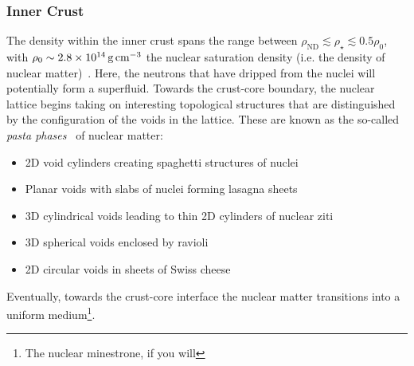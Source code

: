 \subsubsection*{Inner Crust}
The density within the inner crust spans the range between $\rho_\mathrm{ND}\lesssim \rho_\star \lesssim 0.5\rho_0$, with $\rho_0 \sim 2.8\times 10^{14}{\rm \,g}{\rm \,cm}^{-3}$ the nuclear saturation density (i.e. the density of nuclear matter)~\cite{Lattimer:2004pg_Physicsneutronstars,Haensel_NeutronstarsEqation,Grill:2014aea_Equationstatethickness}. Here, the neutrons that have dripped from the nuclei will potentially form a superfluid. Towards the crust-core boundary, the nuclear lattice begins taking on interesting topological structures that are distinguished by the configuration of the voids in the lattice. These are known as the so-called \textit{pasta phases}~\cite{Watanabe:2004tr_SimulationtransitionsPasta,Avancini:2010ch_Warmpastaphase,Yakovlev:2015vma_Electrontransportnuclear} of nuclear matter:
\begin{itemize}
    \item 2D void cylinders creating spaghetti structures of nuclei
    \item Planar voids with slabs of nuclei forming lasagna sheets
    \item 3D cylindrical voids leading to thin 2D cylinders of nuclear ziti
    \item 3D spherical voids enclosed by ravioli
    \item 2D circular voids in sheets of Swiss cheese
\end{itemize}
Eventually, towards the crust-core interface the nuclear matter transitions into a uniform medium\footnote{The nuclear minestrone, if you will}. 

